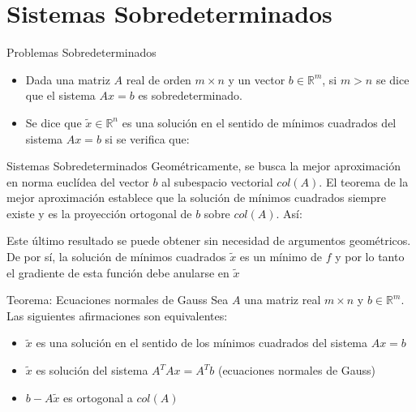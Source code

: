 \documentclass{beamer}
\begin{document}
\section{Sistemas Sobredeterminados}
\begin{frame}{Problemas Sobredeterminados}
\begin{itemize}
 \item<1-> Dada  una matriz $A$ real de orden $m \times n$ y un vector $ b \in \mathbb{R}^m$, si $m>n$ se dice que el 
sistema $Ax=b$ es sobredeterminado.
\item<2-> Se dice que $\tilde x\in \mathbb{R}^n$ es una soluci\'on en el sentido de m\'inimos cuadrados del sistema 
$Ax=b$ si se verifica que:
\end{itemize}
\end{frame}
\begin{frame}{Sistemas Sobredeterminados}
Geom\'etricamente, se busca la mejor aproximaci\'on en norma eucl\'idea del vector $b$ al subespacio vectorial 
$col(A)$. El teorema de la mejor aproximaci\'on establece que la soluci\'on de m\'inimos cuadrados siempre existe y es 
la proyecci\'on ortogonal de $b$ sobre $col(A)$. As\'i:
\end{frame}
\begin{frame}{}
 Este \'ultimo resultado se puede obtener sin necesidad de argumentos geom\'etricos. De por s\'i, la soluci\'on de 
m\'inimos cuadrados $\tilde x$ es un m\'inimo de $f$ y por lo tanto el gradiente de esta funci\'on debe anularse en 
$\tilde x$
\end{frame}
\begin{frame}{}
 \begin{block}{Teorema: Ecuaciones normales de Gauss}
 Sea $A$ una matriz real $m \times n$ y $b \in \mathbb{R}^m$. Las siguientes afirmaciones son equivalentes:
 \begin{itemize}
  \item<2-> $\tilde x$ es una soluci\'on en el sentido de los m\'inimos cuadrados del sistema $Ax=b$
  \item<3-> $\tilde x$ es soluci\'on del sistema $A^TAx=A^Tb$ (ecuaciones normales de Gauss)
  \item<4-> $b-A\tilde x$ es ortogonal a $col(A)$
  \end{itemize}
 \end{block}
\end{frame}
\end{document}
